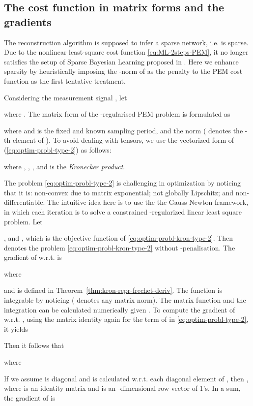 \documentclass[letterpaper,10pt,journal,final]{IEEEtran}
\theoremstyle{definition}
\theoremstyle{remark}
\begin{document}
\subsection{The cost function in matrix forms and the gradients}
\label{sec:pred-errors-mat-gradient}

The reconstruction algorithm is supposed to infer a sparse network, i.e.  is
sparse.  Due to the nonlinear least-square cost function \eqref{eq:ML-2steps-PEM}, it
no longer satisfies the setup of Sparse Bayesian Learning proposed in
\cite{Tipping2001}. Here we enhance sparsity by heuristically imposing the -norm
of  as the penalty to the PEM cost function as the first tentative treatment.

Considering the measurement signal , let

where .
The matrix form of the -regularised PEM problem is formulated as

where  and  is the fixed and known
sampling period, and the  norm 
( denotes the -th element of ).  To avoid dealing with tensors, we
use the vectorized form of (\ref{eq:optim-probl-type-2}) as follows:

where , ,
, and  is the
\emph{Kronecker product}.

The problem \eqref{eq:optim-probl-type-2} is challenging in optimization by noticing
that it is: non-convex due to matrix exponential; not globally Lipschitz; and
non-differentiable. The intuitive idea here is to use the the Gauss-Newton framework,
in which each iteration is to solve a constrained -regularized linear least
square problem. Let

, and , which is the objective function of
\eqref{eq:optim-probl-kron-type-2}. Then  denotes the problem
\eqref{eq:optim-probl-kron-type-2} without -penalisation. The gradient of
 w.r.t.  is

where

and  is defined in Theorem~\ref{thm:kron-repr-frechet-deriv}. The function
 is integrable by noticing 
( denotes any matrix norm). The matrix function  and the
integration can be calculated numerically given .  To compute the gradient of
 w.r.t. , using the matrix identity 
again for the term of  in \eqref{eq:optim-probl-type-2}, it yields

Then it follows that

where

If we assume  is diagonal and  is calculated w.r.t. each diagonal
element of , then ,
where  is an  identity matrix and  is an
-dimensional row vector of 1's.  In a sum, the gradient of  is
\end{document}

